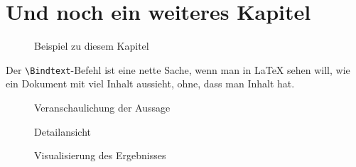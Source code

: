 

\chapter{Und noch ein weiteres Kapitel}

\begin{figure}[p]
  \centering
  \caption{Beispiel zu diesem Kapitel}
  \label{fig:example}
\end{figure}

Der \verb$\Bindtext$-Befehl ist eine nette Sache, wenn man in \LaTeX{} sehen will, wie ein Dokument mit viel Inhalt aussieht, ohne, dass man Inhalt hat. \\
\Blindtext

\begin{figure}[p]
  \centering
  \caption{Veranschaulichung der Aussage}
  \label{fig:illustration}
\end{figure}

\begin{figure}[p]
  \centering
  \caption{Detailansicht}
  \label{fig:detail}
\end{figure}

\begin{figure}[p]
  \centering
  \caption{Visualisierung des Ergebnisses}
  \label{fig:visualization}
\end{figure}